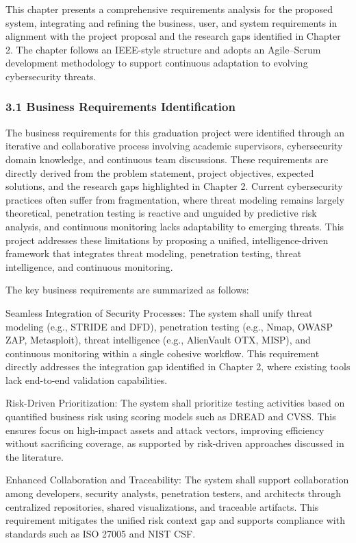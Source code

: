 \documentclass[12pt,a4paper]{report}
\begin{document}
This chapter presents a comprehensive requirements analysis for the proposed system, integrating and refining the business, user, and system requirements in alignment with the project proposal and the research gaps identified in Chapter 2. The chapter follows an IEEE-style structure and adopts an Agile–Scrum development methodology to support continuous adaptation to evolving cybersecurity threats.

\subsubsection{3.1 Business Requirements Identification}

The business requirements for this graduation project were identified through an iterative and collaborative process involving academic supervisors, cybersecurity domain knowledge, and continuous team discussions. These requirements are directly derived from the problem statement, project objectives, expected solutions, and the research gaps highlighted in Chapter 2. Current cybersecurity practices often suffer from fragmentation, where threat modeling remains largely theoretical, penetration testing is reactive and unguided by predictive risk analysis, and continuous monitoring lacks adaptability to emerging threats. This project addresses these limitations by proposing a unified, intelligence-driven framework that integrates threat modeling, penetration testing, threat intelligence, and continuous monitoring.

The key business requirements are summarized as follows:

Seamless Integration of Security Processes: The system shall unify threat modeling (e.g., STRIDE and DFD), penetration testing (e.g., Nmap, OWASP ZAP, Metasploit), threat intelligence (e.g., AlienVault OTX, MISP), and continuous monitoring within a single cohesive workflow. This requirement directly addresses the integration gap identified in Chapter 2, where existing tools lack end-to-end validation capabilities.

Risk-Driven Prioritization: The system shall prioritize testing activities based on quantified business risk using scoring models such as DREAD and CVSS. This ensures focus on high-impact assets and attack vectors, improving efficiency without sacrificing coverage, as supported by risk-driven approaches discussed in the literature.

Enhanced Collaboration and Traceability: The system shall support collaboration among developers, security analysts, penetration testers, and architects through centralized repositories, shared visualizations, and traceable artifacts. This requirement mitigates the unified risk context gap and supports compliance with standards such as ISO 27005 and NIST CSF.
\end{document}
